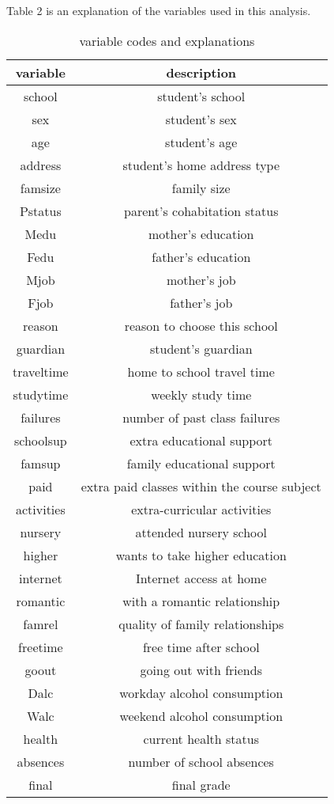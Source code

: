 \documentclass[12pt,english]{article}
\begin{document}
Table 2 is an explanation of the variables used in this analysis.
\begin{table}[h!]
\begin{center}
 \begin{tabular}{|c|c|} 
 \hline
 variable & description  \\ [0.5ex] 
 \hline\hline
 school & student's school \\ 
 \hline 
 sex & student's sex \\
 \hline 
age & student's age \\
\hline  
address & student's home address type\\
 \hline 
 famsize & family size \\
 \hline 
 Pstatus & parent's cohabitation status \\
\hline  
Medu & mother's education \\
\hline  
Fedu & father's education\\
 \hline 
 Mjob & mother's job \\
 \hline 
 Fjob & father's job \\
\hline 
reason & reason to choose this school\\
\hline 
guardian & student's guardian\\
\hline 
traveltime & home to school travel time\\
\hline 
studytime & weekly study time\\
\hline 
failures & number of past class failures\\
\hline 
schoolsup & extra educational support \\
\hline 
famsup & family educational support \\
\hline 
paid & extra paid classes within the course subject  \\
\hline 
activities & extra-curricular activities \\
\hline 
nursery & attended nursery school\\
\hline 
higher & wants to take higher education \\
\hline 
 internet & Internet access at home \\
 \hline 
romantic & with a romantic relationship \\
\hline 
famrel & quality of family relationships \\
\hline 
freetime & free time after school\\ 
\hline 
goout & going out with friends \\
\hline 
Dalc & workday alcohol consumption  \\
\hline
Walc & weekend alcohol consumption\\
\hline 
health & current health status \\
\hline 
absences & number of school absences\\
\hline 
final & final grade\\
\hline
\end{tabular}
\caption{variable codes and explanations}
\label{table:2}
\end{center}
\end{table}
\end{document}
